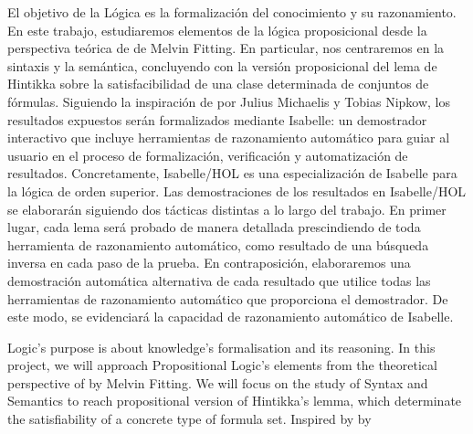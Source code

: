 %
\begin{isabellebody}%
%
%
\isadelimtheory
%
\endisadelimtheory
%
\isatagtheory
%
\endisatagtheory
{\isafoldtheory}%
%
\isadelimtheory
%
\endisadelimtheory
%
\begin{isamarkuptext}%
El objetivo de la Lógica es la formalización del conocimiento y su
razonamiento. En este trabajo, estudiaremos elementos de la lógica
proposicional desde la perspectiva teórica de   de Melvin Fitting. En particular, nos 
centraremos en la sintaxis y la semántica, concluyendo con la versión 
proposicional del lema de Hintikka sobre la satisfacibilidad de una 
clase determinada de conjuntos de fórmulas. Siguiendo la inspiración de 
  por Julius Michaelis y Tobias 
Nipkow, los resultados expuestos serán formalizados mediante Isabelle: 
un demostrador interactivo que incluye herramientas de razonamiento 
automático para guiar al usuario en el proceso de formalización, 
verificación y automatización de resultados. Concretamente, Isabelle/HOL 
es una especialización de Isabelle para la lógica de orden superior. 
Las demostraciones de los resultados en Isabelle/HOL se elaborarán 
siguiendo dos tácticas distintas a lo largo del trabajo. En primer 
lugar, cada lema será probado de manera detallada prescindiendo de toda 
herramienta de razonamiento automático, como resultado de una búsqueda 
inversa en cada paso de la prueba. En contraposición, elaboraremos una 
demostración automática alternativa de cada resultado que utilice todas 
las herramientas de razonamiento automático que proporciona el 
demostrador. De este modo, se evidenciará la capacidad de razonamiento 
automático de Isabelle.%
\end{isamarkuptext}\isamarkuptrue%
%
\begin{isamarkuptext}%
Logic’s purpose is about knowledge’s formalisation and its 
reasoning. In this project, we will approach Propositional Logic’s 
elements from the theoretical perspective of   by Melvin Fitting. We will focus on the 
study of Syntax and Semantics to reach propositional version of 
Hintikka’s lemma, which determinate the satisfiability of a concrete 
type of formula set. Inspired by   by 

\end{isamarkuptext}
\end{isabellebody}
